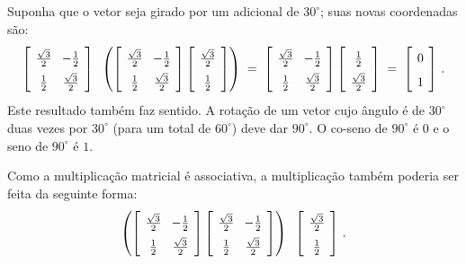 Suponha que o vetor seja girado por um adicional de $30^{\circ}$; suas novas coordenadas são:
\begin{equation}\label{eq.rotate1}
\spacearray
\left[\begin{array}{cc}\frac{\sqrt{3}}{2}&-\frac{1}{2}\\\frac{1}{2}&\frac{\sqrt{3}}{2}\end{array}\right]\;\;
\left(\left[\begin{array}{cc}\frac{\sqrt{3}}{2}&-\frac{1}{2}\\\frac{1}{2}&\frac{\sqrt{3}}{2}\end{array}\right]
\left[\begin{array}{c}\frac{\sqrt{3}}{2}\\\frac{1}{2}\end{array}\right]\right)\;=\;
\left[\begin{array}{cc}\frac{\sqrt{3}}{2}&-\frac{1}{2}\\\frac{1}{2}&\frac{\sqrt{3}}{2}\end{array}\right]
\left[\begin{array}{c}\frac{1}{2}\\\frac{\sqrt{3}}{2}\end{array}\right]\;=\;
\left[\begin{array}{c}0\\1\end{array}\right]\,.
\end{equation}
Este resultado também faz sentido. A rotação de um vetor cujo ângulo é de $30^{\circ}$ duas vezes por $30^{\circ}$ (para um total de $60^{\circ}$) deve dar $90^{\circ}$. O co-seno de $90^{\circ}$ é $0$ e o seno de $90^{\circ}$ é $1$.

Como a multiplicação matricial é associativa, a multiplicação também poderia ser feita da seguinte forma:
\begin{equation}\label{eq.rotate2}
\spacearray
\left(\left[\begin{array}{cc}\frac{\sqrt{3}}{2}&-\frac{1}{2}\\\frac{1}{2}&\frac{\sqrt{3}}{2}\end{array}\right]
\left[\begin{array}{cc}\frac{\sqrt{3}}{2}&-\frac{1}{2}\\\frac{1}{2}&\frac{\sqrt{3}}{2}\end{array}\right]\right)\;\;
\left[\begin{array}{c}\frac{\sqrt{3}}{2}\\\frac{1}{2}\end{array}\right]\,.
\end{equation}

